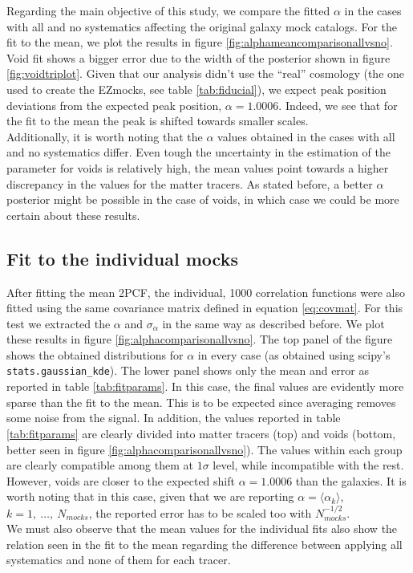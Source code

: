 \documentclass[fleqn, usenatbib]{mnras}
\begin{document}
Regarding the main objective of this study, we compare the fitted $\alpha$ in the cases with all and no systematics affecting the original galaxy mock catalogs. For the fit to the mean, we plot the results in figure \ref{fig:alphameancomparisonallvsno}. Void fit shows a bigger error due to the width of the posterior shown in figure \ref{fig:voidtriplot}. Given that our analysis didn't use the ``real'' cosmology (the one used to create the EZmocks, see table \ref{tab:fiducial}), we expect peak position deviations from the expected peak position, $\alpha=1.0006$. Indeed, we see that for the fit to the mean the peak is shifted towards smaller scales.\\
Additionally, it is worth noting that the $\alpha$ values obtained in the cases with all and no systematics differ. Even tough the uncertainty in the estimation of the parameter for voids is relatively high, the mean values point towards a higher discrepancy in the values for the matter tracers. As stated before, a better $\alpha$ posterior might be possible in the case of voids, in which case we could be more certain about these results.
\subsection{Fit to the individual mocks}
After fitting the mean 2PCF, the individual, 1000 correlation functions were also fitted using the same covariance matrix defined in equation \ref{eq:covmat}. For this test we extracted the $\alpha$ and $\sigma_\alpha$ in the same way as described before. We plot these results in figure \ref{fig:alphacomparisonallvsno}. The top panel of the figure shows the obtained distributions for $\alpha$ in every case (as obtained using scipy's \texttt{stats.gaussian\_kde}). The lower panel shows only the mean and error as reported in table \ref{tab:fitparams}. In this case, the final values are evidently more sparse than the fit to the mean. This is to be expected since averaging removes some noise from the signal. In addition, the values reported in table \ref{tab:fitparams} are clearly divided into matter tracers (top) and voids (bottom, better seen in figure \ref{fig:alphacomparisonallvsno}). The values within each group are clearly compatible among them at $1\sigma$ level, while incompatible with the rest. However, voids are closer to the expected shift $\alpha = 1.0006$ than the galaxies. It is worth noting that in this case, given that we are reporting $\alpha = \langle\alpha_k\rangle$, $k=1,\ \dots,\ N_{mocks}$, the reported error has to be scaled too with $N_{mocks}^{-1/2}$.\\
We must also observe that the mean values for the individual fits also show the relation seen in the fit to the mean regarding the difference between applying all systematics and none of them for each tracer.
\end{document}
